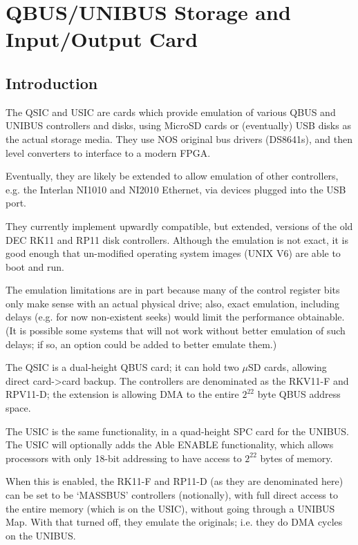 %

\chapter{QBUS/UNIBUS Storage and Input/Output Card}
\section{Introduction}

The QSIC and USIC are cards which provide emulation of various QBUS and
UNIBUS controllers and disks, using MicroSD cards or (eventually) USB disks
as the actual storage media. They use NOS original bus drivers (DS8641s),
and then level converters to interface to a modern FPGA.

Eventually, they are likely be extended to allow emulation of other
controllers, e.g. the Interlan NI1010 and NI2010 Ethernet, via devices
plugged into the USB port.

They currently implement upwardly compatible, but extended, versions of the
old DEC RK11 and RP11 disk controllers. Although the emulation is not exact,
it is good enough that un-modified operating system images (UNIX V6) are able
to boot and run.

The emulation limitations are in part because many of the control register
bits only make sense with an actual physical drive; also, exact emulation,
including delays (e.g. for now non-existent seeks) would limit the
performance obtainable. (It is possible some systems that will not work
without better emulation of such delays; if so, an option could be added to
better emulate them.)

The QSIC is a dual-height QBUS card; it can hold two $\mu$SD cards,
allowing direct card-\textgreater card backup. The controllers are
denominated as the RKV11-F and RPV11-D; the extension is allowing DMA
to the entire $2^{22}$ byte QBUS address space.

The USIC is the same functionality, in a quad-height SPC card for the UNIBUS.
The USIC will optionally adds the Able ENABLE functionality, which allows
processors with only 18-bit addressing to have access to $2^{22}$ bytes of
memory.

When this is enabled, the RK11-F and RP11-D (as they are denominated here)
can be set to be `MASSBUS' controllers (notionally), with full direct access
to the entire memory (which is on the USIC), without going through a UNIBUS
Map. With that turned off, they emulate the originals; i.e. they do DMA
cycles on the UNIBUS.

